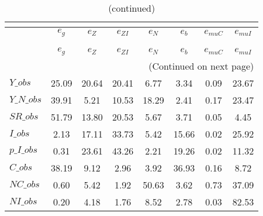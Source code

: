  
\begin{center}
\begin{longtable}{lccccccc} 
\caption{VARIANCE DECOMPOSITION (in percent)}\\
 \label{Table:th_var_decomp_uncond}\\
\toprule 
$               $	 & 	 $        {e_g}$	 & 	 $        {e_Z}$	 & 	 $     {e_{ZI}}$	 & 	 $        {e_N}$	 & 	 $        {e_b}$	 & 	 $    {e_{muC}}$	 & 	 $    {e_{muI}}$\\
\midrule \endfirsthead 
\caption{(continued)}\\
 \toprule \\ 
$               $	 & 	 $        {e_g}$	 & 	 $        {e_Z}$	 & 	 $     {e_{ZI}}$	 & 	 $        {e_N}$	 & 	 $        {e_b}$	 & 	 $    {e_{muC}}$	 & 	 $    {e_{muI}}$\\
\midrule \endhead 
\midrule \multicolumn{8}{r}{(Continued on next page)} \\ \bottomrule \endfoot 
\bottomrule \endlastfoot 
$Y\_obs         $	 & 	        25.09	 & 	        20.64	 & 	        20.41	 & 	         6.77	 & 	         3.34	 & 	         0.09	 & 	        23.67 \\ 
$Y\_N\_obs      $	 & 	        39.91	 & 	         5.21	 & 	        10.53	 & 	        18.29	 & 	         2.41	 & 	         0.17	 & 	        23.47 \\ 
$SR\_obs        $	 & 	        51.79	 & 	        13.80	 & 	        20.53	 & 	         5.67	 & 	         3.71	 & 	         0.05	 & 	         4.45 \\ 
$I\_obs         $	 & 	         2.13	 & 	        17.11	 & 	        33.73	 & 	         5.42	 & 	        15.66	 & 	         0.02	 & 	        25.92 \\ 
$p\_I\_obs      $	 & 	         0.31	 & 	        23.61	 & 	        43.26	 & 	         2.21	 & 	        19.26	 & 	         0.02	 & 	        11.32 \\ 
$C\_obs         $	 & 	        38.19	 & 	         9.12	 & 	         2.96	 & 	         3.92	 & 	        36.93	 & 	         0.16	 & 	         8.72 \\ 
$NC\_obs        $	 & 	         0.60	 & 	         5.42	 & 	         1.92	 & 	        50.63	 & 	         3.62	 & 	         0.73	 & 	        37.09 \\ 
$NI\_obs        $	 & 	         0.20	 & 	         4.18	 & 	         1.76	 & 	         8.52	 & 	         2.78	 & 	         0.03	 & 	        82.53 \\ 

\end{longtable}
\end{center}
